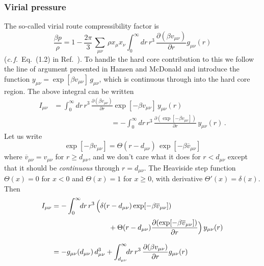 \documentclass[12pt,a4paper]{article}
\newcommand{\latin}[1]{\emph{#1}}
\newcommand{\cf}{\latin{c.\,f.}}
\newcommand{\Refcite}[1]{Ref.~\cite{#1}}
\begin{document}
\subsubsection{Virial pressure}
%
The so-called virial route compressibility factor is
%
\begin{equation}
\frac{\beta p}{\rho}=1-\frac{2\pi}{3}\,{\textstyle \sum_{\mu\nu}}\,
\rho x_\mu x_\nu \int_0^\infty\!\!dr\,r^3\,\frac{\partial(\beta
  v_{\mu\nu})}{\partial r} g_{\mu\nu}(r)
\end{equation}
%
(\cf\ Eq.~(1.2) in \Refcite{Vrbka09}).  To handle the hard core
contribution to this we follow the line of argument presented in
Hansen and McDonald \cite{HM06} and introduce the function
$y_{\mu\nu}=\exp[\beta v_{\mu\nu}]\,g_{\mu\nu}$, which is continuous
through into the hard core region.  The above integral can be written
%
\begin{equation}
\begin{split}
I_{\mu\nu}&=\int_0^\infty\!\!dr\,r^3\,\frac{\partial(\beta
  v_{\mu\nu})}{\partial r} \exp[-\beta v_{\mu\nu}]\,y_{\mu\nu}(r)\\[6pt]
&{}\hspace{8em}{}=-\int_0^\infty\!\!dr\,r^3\,\frac{\partial(\exp[-\beta
    v_{\mu\nu}])}{\partial r} \,y_{\mu\nu}(r)\,.
\end{split}
\end{equation}
%
Let us write
%
\begin{equation}
\exp[-\beta v_{\mu\nu}]=\Theta(r-d_{\mu\nu})\,\exp[-\beta \overline v_{\mu\nu}]
\end{equation}
%
where $\overline v_{\mu\nu}=v_{\mu\nu}$ for $r\ge d_{\mu\nu}$, and we
don't care what it does for $r<d_{\mu\nu}$ except that it should be
\emph{continuous} through $r=d_{\mu\nu}$.  The Heaviside step function
$\Theta(x)=0$ for $x<0$ and $\Theta(x)=1$ for $x\ge0$, with derivative
$\Theta'(x)=\delta(x)$. Then
%
\begin{equation}
\begin{split}
I_{\mu\nu}&=-\int_0^\infty\!\!dr\,r^3\,\Bigl(\delta(r-d_{\mu\nu})
\exp[-\beta \overline v_{\mu\nu}])\\[3pt]
&{}\hspace{8em}{}+\Theta(r-d_{\mu\nu})
\frac{\partial(\exp[-\beta
    \overline v_{\mu\nu}])}{\partial r} \Bigr)\,y_{\mu\nu}(r)\\[9pt]
&=-g_{\mu\nu}(d_{\mu\nu})\,d_{\mu\nu}^3+
\int_{d_{\mu\nu}}^\infty\!\!dr\,r^3\,\frac{\partial(\beta
  v_{\mu\nu})}{\partial r} g_{\mu\nu}(r)
\end{split}
\end{equation}
\end{document}
